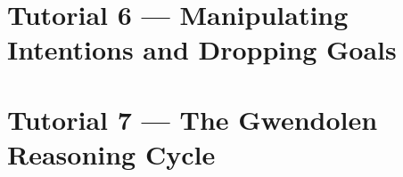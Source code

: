 \section{Tutorial 6 --- Manipulating Intentions and Dropping Goals}

{
  \let\section\subsection
  \let\subsection\subsubsection
  \let\subsubsection\paragraph
  
  
  }

\section{Tutorial 7 --- The Gwendolen Reasoning Cycle}

{
  \let\section\subsection
  \let\subsection\subsubsection
  \let\subsubsection\paragraph
  
  
  }

